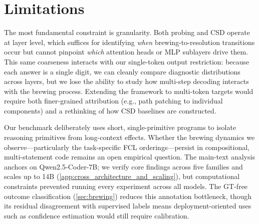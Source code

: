 
\section*{Limitations}

The most fundamental constraint is granularity. Both probing and CSD operate at layer level, which suffices for identifying \emph{when} brewing-to-resolution transitions occur but cannot pinpoint \emph{which} attention heads or MLP sublayers drive them. This same coarseness interacts with our single-token output restriction: because each answer is a single digit, we can cleanly compare diagnostic distributions across layers, but we lose the ability to study how multi-step decoding interacts with the brewing process. Extending the framework to multi-token targets would require both finer-grained attribution (e.g., path patching to individual components) and a rethinking of how CSD baselines are constructed.

Our benchmark deliberately uses short, single-primitive programs to isolate reasoning primitives from long-context effects. Whether the brewing dynamics we observe---particularly the task-specific FCL orderings---persist in compositional, multi-statement code remains an open empirical question. The main-text analysis anchors on Qwen2.5-Coder-7B; we verify core findings across five families and scales up to 14B (\cref{app:cross_architecture_and_scaling}), but computational constraints prevented running every experiment across all models. The GT-free outcome classification (\cref{sec:brewing}) reduces this annotation bottleneck, though its residual disagreement with supervised labels means deployment-oriented uses such as confidence estimation would still require calibration.
